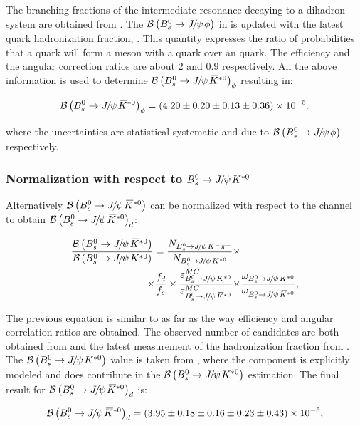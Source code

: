 \noindent The branching fractions of the intermediate resonance decaying to a dihadron system are obtained from \cite{PDG}.
The $\BRof\BsJpsiPhi$ in \cite{SheldonKK} is updated with the latest \bquark quark hadronization
fraction, \fdfs \cite{LHCb-CONF-2013-011}. This quantity expresses the ratio of probabilities that a \bquark quark will form a meson with a
\dquark quark over an \squark quark. The efficiency and the angular correction ratios are about $2$ and $0.9$ respectively.
All the above information is used to determine $\BRof{\BsJpsiKst}_\phi$ resulting in:

\begin{equation}
  \centering
\BRof\BsJpsiKst_{\phi} = (4.20 \pm 0.20 \pm 0.13 \pm 0.36) \times 10^{-5}.
\label{Br_JpsiPhi}
\end{equation}

where the uncertainties are statistical systematic and due to $\BRof\BsJpsiPhi$ respectively.

\subsubsection{Normalization with respect to $\BdJpsiKst$}
Alternatively $\BRof\BsJpsiKst$ can be normalized with respect to the \BdJpsiKst channel to obtain $\BRof{\BsJpsiKst}_d$:

\begin{align}
  \centering
\frac{\BRof\BsJpsiKst}{\BRof\BdJpsiKst} = \frac{N_{\BsJpsiKpi}}{N_{\BdJpsiKst}} \times & \nonumber \\
                                   \times \fdfs
                                   \times \frac{\varepsilon_{\BdJpsiKst}^{MC}}{\varepsilon_{\BsJpsiKst}^{MC}}
                                   \times &\frac{\omega_{\BdJpsiKst}}{\omega_{\BsJpsiKst}},
\label{norm_jpsiKst}
\end{align}

\noindent The previous equation is similar to  as far as the way efficiency and angular correlation ratios are obtained.
The observed number of candidates are both obtained from  and the latest measurement of the hadronization
fraction from \cite{LHCb-CONF-2013-011}. The $\BRof\BdJpsiKst$ value is taken from \cite{Abe:2002haa}, where the \swave component 
is explicitly modeled and does contribute in the $\BRof\BdJpsiKst$ estimation. The final result for $\BRof{\BsJpsiKst}_d$ is:

\begin{equation}
  \centering
\BRof\BsJpsiKst_{d} = (3.95 \pm 0.18 \pm 0.16 \pm 0.23 \pm 0.43 )\times 10^{-5},
\label{Br_JpsiKst}
\end{equation}

